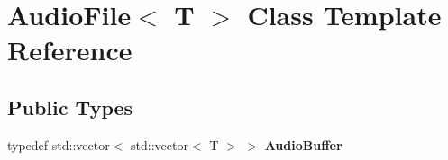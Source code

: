 \hypertarget{classAudioFile}{}\section{Audio\+File$<$ T $>$ Class Template Reference}
\label{classAudioFile}
\subsection*{Public Types}
\begin{DoxyCompactItemize}
\item 
\mbox{\label{classAudioFile_ad1260a47791dc30cbabfe3ff2ea099b1}} 
typedef std\+::vector$<$ std\+::vector$<$ T $>$ $>$ {\bfseries Audio\+Buffer}
\end{DoxyCompactItemize}
